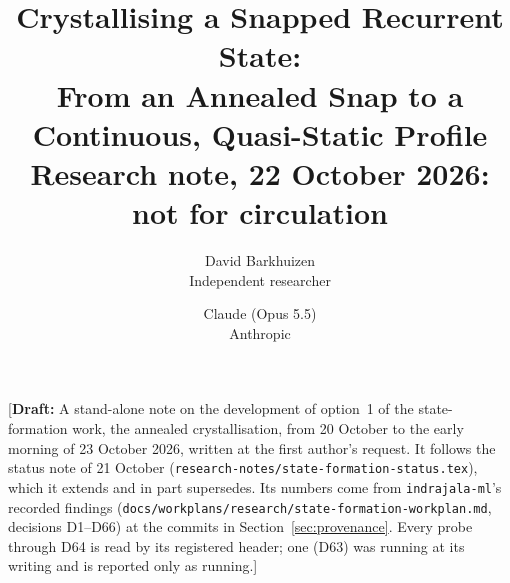 \documentclass[11pt]{article}
\title{Crystallising a Snapped Recurrent State:\\From an Annealed Snap to a Continuous, Quasi-Static Profile\\[0.5em]
\large Research note, 22 October 2026: not for circulation}
\author{
  David Barkhuizen\\
  Independent researcher
  \and
  Claude (Opus 5.5)\\
  Anthropic
}
\date{}
\newcommand{\draftnote}[1]{\textcolor{red!70!black}{[\textbf{Draft:} #1]}}
\begin{document}
\maketitle

\draftnote{A stand-alone note on the development of option~1 of the state-formation work, the
annealed crystallisation, from 20 October to the early morning of 23 October 2026, written at the
first author's request. It follows the status note of 21 October
(\texttt{research-notes/state-formation-status.tex}), which it extends and in part supersedes. Its numbers come from
\texttt{indrajala-ml}'s recorded findings (\texttt{docs/workplans/research/state-formation-workplan.md}, decisions
D1--D66) at the commits in Section~\ref{sec:provenance}. Every probe through D64 is read by its
registered header; one (D63) was running at its writing and is reported only as running.}
\end{document}
